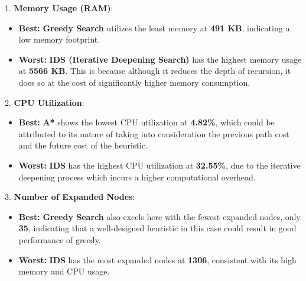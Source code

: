 \documentclass{article}
\begin{document}
1. \textbf{Memory Usage (RAM)}:
\begin{itemize}
    \item \textbf{Best:} \textbf{Greedy Search} utilizes the least memory at \textbf{491 KB}, indicating a low memory footprint.
    \item \textbf{Worst:} \textbf{IDS (Iterative Deepening Search)} has the highest memory usage at \textbf{5566 KB}. This is because although it reduces the depth of recursion, it does so at the cost of significantly higher memory consumption.
\end{itemize}
2. \textbf{CPU Utilization}:
\begin{itemize}
    \item \textbf{Best:} \textbf{A*} shows the lowest CPU utilization at \textbf{4.82\%}, which could be attributed to its nature of taking into consideration the previous path cost and the future cost of the heuristic.
    \item \textbf{Worst:} \textbf{IDS} has the highest CPU utilization at \textbf{32.55\%}, due to the iterative deepening process which incurs a higher computational overhead.
\end{itemize}
3. \textbf{Number of Expanded Nodes}:
\begin{itemize}
    \item \textbf{Best:} \textbf{Greedy Search} also excels here with the fewest expanded nodes, only \textbf{35}, indicating that a well-designed heuristic in this case could result in good performance of greedy.
    \item \textbf{Worst:} \textbf{IDS} has the most expanded nodes at \textbf{1306}, consistent with its high memory and CPU usage.
\end{itemize}
\end{document}
